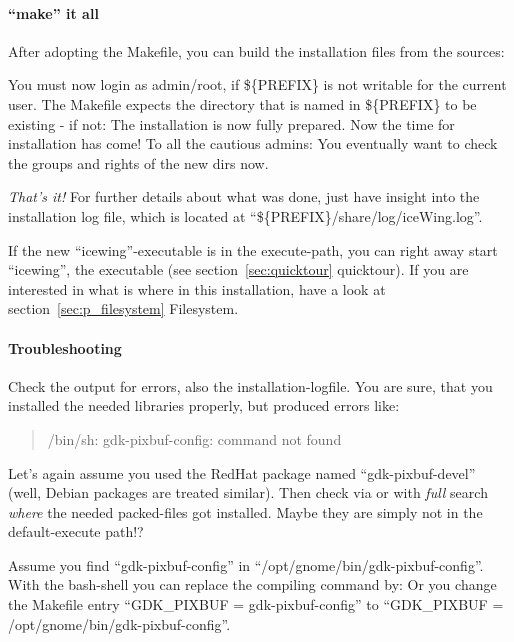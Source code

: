 \paragraph{``make'' it all}
After adopting the Makefile, you can build the installation files
from the sources:
\sS
{}

You must now login as admin/root, if \$\{PREFIX\} is not writable for
the current user. The Makefile expects the directory that is named
in \$\{PREFIX\} to be existing - if not:
\sS
{}
\sE
The installation is now fully prepared. Now the time for 
installation has come!
\sS
{}
\sE
To all the cautious admins: 
You eventually want to check the groups and rights of the new dirs
now.

{\em That's it!}
For further details about what was done, just have insight into the
installation log file, which is located at
``\$\{PREFIX\}/share/log/iceWing.log''.

If the new ``icewing''-executable is in the execute-path, you can
right away start ``icewing'', the executable (see
section~\ref{sec:quicktour} quicktour). If you are interested in what is
where in this installation, have a look at
section~\ref{sec:p_filesystem} Filesystem.

\paragraph{Troubleshooting}

Check the output for errors, also the installation-logfile. You are
sure, that you installed the needed libraries properly, but
\sS
{}
\sE
produced errors like:
\begin{quote}
/bin/sh: gdk-pixbuf-config: command not found
\end{quote}

Let's again assume you used the RedHat package named
``gdk-pixbuf-devel'' (well, Debian packages are treated similar).
Then check via
\sS
{}
\sE
or with {\em full} search
\sS
{}
\sE
{\em where} the needed packed-files got installed.
Maybe they are simply not in the default-execute path!?

Assume you find ``gdk-pixbuf-config'' 
in ``/opt/gnome/bin/gdk-pixbuf-config''. With the bash-shell
you can replace the compiling 
\sS
{}
\sE
command by:
\sS
{}
\sE
Or you change the Makefile entry ``GDK\_PIXBUF = gdk-pixbuf-config''
to ``GDK\_PIXBUF = /opt/gnome/bin/gdk-pixbuf-config''.

